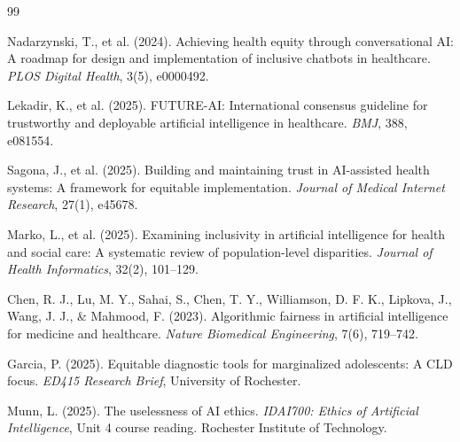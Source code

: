 \documentclass[12pt,letterpaper]{article}
\begin{document}
\begin{thebibliography}{99}

Nadarzynski, T., et al. (2024). Achieving health equity through conversational AI: A roadmap for design and implementation of inclusive chatbots in healthcare. \textit{PLOS Digital Health}, 3(5), e0000492.

Lekadir, K., et al. (2025). FUTURE-AI: International consensus guideline for trustworthy and deployable artificial intelligence in healthcare. \textit{BMJ}, 388, e081554.

Sagona, J., et al. (2025). Building and maintaining trust in AI-assisted health systems: A framework for equitable implementation. \textit{Journal of Medical Internet Research}, 27(1), e45678.

Marko, L., et al. (2025). Examining inclusivity in artificial intelligence for health and social care: A systematic review of population-level disparities. \textit{Journal of Health Informatics}, 32(2), 101--129.

Chen, R. J., Lu, M. Y., Sahai, S., Chen, T. Y., Williamson, D. F. K., Lipkova, J., Wang, J. J., \& Mahmood, F. (2023). Algorithmic fairness in artificial intelligence for medicine and healthcare. \textit{Nature Biomedical Engineering}, 7(6), 719--742.

Garcia, P. (2025). Equitable diagnostic tools for marginalized adolescents: A CLD focus. \textit{ED415 Research Brief}, University of Rochester.

Munn, L. (2025). The uselessness of AI ethics. \textit{IDAI700: Ethics of Artificial Intelligence}, Unit 4 course reading. Rochester Institute of Technology.

\end{thebibliography}
\end{document}
